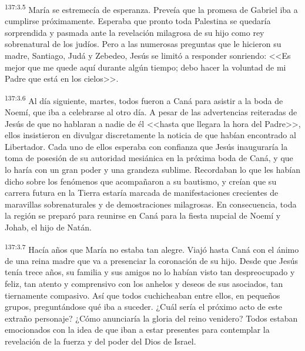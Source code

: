 \par 
\textsuperscript{137:3.5} María se estremecía de esperanza. Preveía que la promesa de Gabriel iba a cumplirse próximamente. Esperaba que pronto toda Palestina se quedaría sorprendida y pasmada ante la revelación milagrosa de su hijo como rey sobrenatural de los judíos. Pero a las numerosas preguntas que le hicieron su madre, Santiago, Judá y Zebedeo, Jesús se limitó a responder sonriendo: <<Es mejor que me quede aquí durante algún tiempo; debo hacer la voluntad de mi Padre que está en los cielos>>.

\par 
\textsuperscript{137:3.6} Al día siguiente, martes, todos fueron a Caná para asistir a la boda de Noemí, que iba a celebrarse al otro día. A pesar de las advertencias reiteradas de Jesús de que no hablaran a nadie de él <<hasta que llegara la hora del Padre>>, ellos insistieron en divulgar discretamente la noticia de que habían encontrado al Libertador. Cada uno de ellos esperaba con confianza que Jesús inauguraría la toma de posesión de su autoridad mesiánica en la próxima boda de Caná, y que lo haría con un gran poder y una grandeza sublime. Recordaban lo que les habían dicho sobre los fenómenos que acompañaron a su bautismo, y creían que su carrera futura en la Tierra estaría marcada de manifestaciones crecientes de maravillas sobrenaturales y de demostraciones milagrosas. En consecuencia, toda la región se preparó para reunirse en Caná para la fiesta nupcial de Noemí y Johab, el hijo de Natán.

\par 
\textsuperscript{137:3.7} Hacía años que María no estaba tan alegre. Viajó hasta Caná con el ánimo de una reina madre que va a presenciar la coronación de su hijo. Desde que Jesús tenía trece años, su familia y sus amigos no lo habían visto tan despreocupado y feliz, tan atento y comprensivo con los anhelos y deseos de sus asociados, tan tiernamente compasivo. Así que todos cuchicheaban entre ellos, en pequeños grupos, preguntándose qué iba a suceder. ¿Cuál sería el próximo acto de este extraño personaje? ¿Cómo anunciaría la gloria del reino venidero? Todos estaban emocionados con la idea de que iban a estar presentes para contemplar la revelación de la fuerza y del poder del Dios de Israel.

